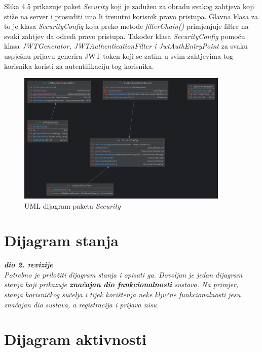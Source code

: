 			Slika 4.5 prikazuje paket \textit{Security} koji je zadužen za obradu svakog zahtjeva koji stiže na server i prosuditi ima li trenutni korisnik pravo pristupa. Glavna klasa za to je klasa \textit{SecurityConfig} koja preko metode \textit{filterChain()} primjenjuje filtre na svaki zahtjev da odredi pravo pristupa. Također klasa \textit{SecurityConfig} pomoću klasa \textit{JWTGenerator, JWTAuthenticationFilter i JwtAuthEntryPoint} za svaku uspješnu prijavu generira JWT token koji se zatim u svim zahtjevima tog korisnika koristi za autentifikaciju tog korisnika.
			
			\begin{figure}[htbp]
				\centering
				\includegraphics[width=0.9\textwidth]{slike/securityUML}
				\caption{UML dijagram paketa \textit{Security}}
				\label{fig:securityUML}
			\end{figure}
			
			
			
			\eject
		
		\section{Dijagram stanja}
			
			
			\textbf{\textit{dio 2. revizije}}\\
			
			\textit{Potrebno je priložiti dijagram stanja i opisati ga. Dovoljan je jedan dijagram stanja koji prikazuje \textbf{značajan dio funkcionalnosti} sustava. Na primjer, stanja korisničkog sučelja i tijek korištenja neke ključne funkcionalnosti jesu značajan dio sustava, a registracija i prijava nisu. }
			
			
			\eject 
		
		\section{Dijagram aktivnosti}
			
